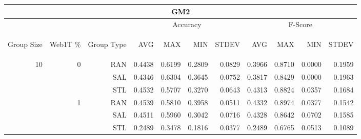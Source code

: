 \begin{center}
\begin{table}[htbp]
\begin{tabular}{ | r | r | r | r | r | r | r | r | r | r | r |}
\hline
\multicolumn{11}{|c|}{GM2}\\
\hline
 & & & \multicolumn{4}{|c|}{Accuracy} & \multicolumn{4}{|c|}{F-Score}\\ \cline{4-11}
\begin{sideways}Group Size\end{sideways} & \begin{sideways}Web1T \%\end{sideways} & \begin{sideways}Group Type\end{sideways} & \begin{sideways}AVG\end{sideways} & \begin{sideways}MAX\end{sideways} & \begin{sideways}MIN\end{sideways} & \begin{sideways}STDEV\end{sideways} & \begin{sideways}AVG\end{sideways} & \begin{sideways}MAX\end{sideways} & \begin{sideways}MIN\end{sideways} & \begin{sideways}STDEV\end{sideways}\\
\hline
\multirow{18}{*}{10}
 & \multirow{3}{*}{0} & RAN & 0.4438 & 0.6199 & 0.2809 & 0.0829 & 0.3966 & 0.8710 & 0.0000 & 0.1959\\ \cline{3-11}
 &   & SAL & 0.4346 & 0.6304 & 0.3645 & 0.0752 & 0.3817 & 0.8429 & 0.0000 & 0.1963\\ \cline{3-11}
 &   & STL & 0.4532 & 0.5707 & 0.3270 & 0.0643 & 0.4313 & 0.8824 & 0.0357 & 0.1684\\ \cline{2-11}
 & \multirow{3}{*}{1} & RAN & 0.4539 & 0.5810 & 0.3958 & 0.0511 & 0.4332 & 0.8974 & 0.0377 & 0.1542\\ \cline{3-11}
 &   & SAL & 0.4511 & 0.5960 & 0.3042 & 0.0716 & 0.4328 & 0.8642 & 0.0702 & 0.1585\\ \cline{3-11}
 &   & STL & 0.2489 & 0.3478 & 0.1816 & 0.0377 & 0.2489 & 0.6765 & 0.0513 & 0.1089\\ \cline{2-11}

\end{tabular}
\end{table}
\end{center}
